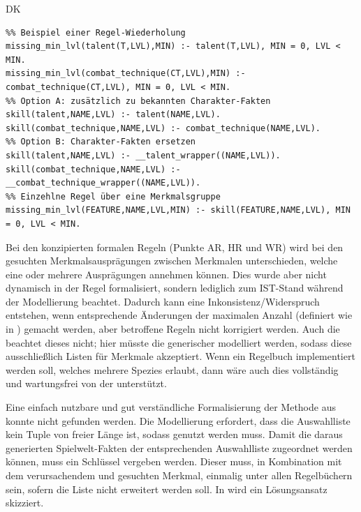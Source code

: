 \begin{enumerateWithCode}{DK}
    \begin{listing}[htbp]
        \caption{Modellierung von strukturell ähnlichen Merkmalen in einer Gruppe}\label{lst:modellierung-von-strukturell-ahnlichen-merkmalen-in-einer-gruppe}
        \begin{verbatim}
%% Beispiel einer Regel-Wiederholung
missing_min_lvl(talent(T,LVL),MIN) :- talent(T,LVL), MIN = 0, LVL < MIN.
missing_min_lvl(combat_technique(CT,LVL),MIN) :- combat_technique(CT,LVL), MIN = 0, LVL < MIN.
%% Option A: zusätzlich zu bekannten Charakter-Fakten
skill(talent,NAME,LVL) :- talent(NAME,LVL).
skill(combat_technique,NAME,LVL) :- combat_technique(NAME,LVL).
%% Option B: Charakter-Fakten ersetzen
skill(talent,NAME,LVL) :- __talent_wrapper((NAME,LVL)).
skill(combat_technique,NAME,LVL) :- __combat_technique_wrapper((NAME,LVL)).
%% Einzehlne Regel über eine Merkmalsgruppe
missing_min_lvl(FEATURE,NAME,LVL,MIN) :- skill(FEATURE,NAME,LVL), MIN = 0, LVL < MIN.
        \end{verbatim}
    \end{listing}

    \item Bei den konzipierten formalen Regeln (Punkte AR, HR und WR) wird bei den gesuchten Merkmalsausprägungen zwischen Merkmalen unterschieden, welche eine oder mehrere Ausprägungen annehmen können.
    Dies wurde aber nicht dynamisch in der Regel formalisiert, sondern lediglich zum IST-Stand während der Modellierung beachtet.
    Dadurch kann eine Inkonsistenz/Widerspruch entstehen, wenn entsprechende Änderungen der maximalen Anzahl (definiert wie in ) gemacht werden, aber betroffene Regeln nicht korrigiert werden.
    Auch die  beachtet dieses nicht; hier müsste die  generischer modelliert werden, sodass diese ausschließlich Listen für Merkmale akzeptiert.
    Wenn \zB ein Regelbuch implementiert werden soll, welches mehrere Spezies erlaubt, dann wäre auch dies vollständig und wartungsfrei von der  unterstützt.

    \item Eine einfach nutzbare und gut verständliche Formalisierung der  Methode aus  konnte nicht gefunden werden.
    Die Modellierung erfordert, dass die Auswahlliste kein Tuple von freier Länge ist, sodass  genutzt werden muss.
    Damit die daraus generierten Spielwelt-Fakten der entsprechenden Auswahlliste zugeordnet werden können, muss ein Schlüssel vergeben werden.
    Dieser muss, in Kombination mit dem verursachendem und gesuchten Merkmal, einmalig unter allen Regelbüchern sein, sofern die Liste nicht erweitert werden soll.
    In  wird ein Lösungsansatz skizziert.


\end{enumerateWithCode}
